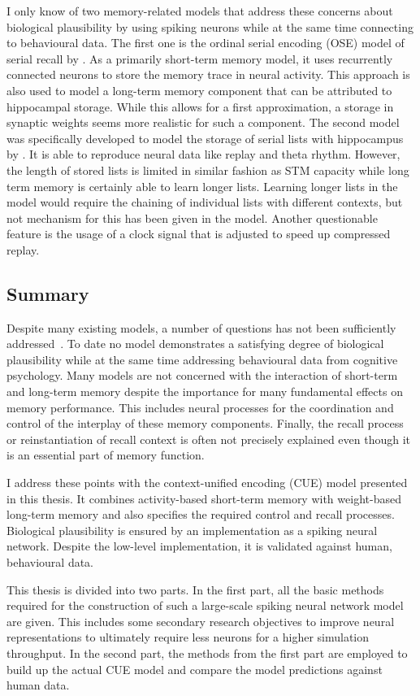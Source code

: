 I only know of two memory-related models that address these concerns about biological plausibility by using spiking neurons while at the same time connecting to behavioural data.
The first one is the ordinal serial encoding (OSE) model of serial recall by \textcite{Choo2010}.
As a primarily short-term memory model, it uses recurrently connected neurons to store the memory trace in neural activity.
This approach is also used to model a long-term memory component that can be attributed to hippocampal storage.
While this allows for a first approximation, a storage in synaptic weights seems more realistic for such a component.
The second model was specifically developed to model the storage of serial lists with hippocampus by \textcite{OliverTrujillo2014}.
It is able to reproduce neural data like replay and theta rhythm.
However, the length of stored lists is limited in similar fashion as STM capacity while long term memory is certainly able to learn longer lists.
Learning longer lists in the model would require the chaining of individual lists with different contexts, but not mechanism for this has been given in the model.
Another questionable feature is the usage of a clock signal that is adjusted to speed up compressed replay.


\subsection{Summary}
Despite many existing models, a number of questions has not been sufficiently addressed~\parencite[cp.][]{horwitz2008}.
To date no model demonstrates a satisfying degree of biological plausibility while at the same time addressing behavioural data from cognitive psychology.
Many models are not concerned with the interaction of short-term and long-term memory despite the importance for many fundamental effects on memory performance.
This includes neural processes for the coordination and control of the interplay of these memory components.
Finally, the recall process or reinstantiation of recall context is often not precisely explained even though it is an essential part of memory function.

I address these points with the context-unified encoding (CUE) model presented in this thesis.
It combines activity-based short-term memory with weight-based long-term memory and also specifies the required control and recall processes.
Biological plausibility is ensured by an implementation as a spiking neural network.
Despite the low-level implementation, it is validated against human, behavioural data.

This thesis is divided into two parts.
In the first part, all the basic methods required for the construction of such a large-scale spiking neural network model are given.
This includes some secondary research objectives to improve neural representations to ultimately require less neurons for a higher simulation throughput.
In the second part, the methods from the first part are employed to build up the actual CUE model and compare the model predictions against human data.
